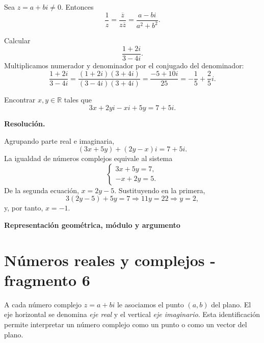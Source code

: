 \begin{proposition}
Sea \(z=a+bi\neq0\). Entonces
\[
\frac1z=\frac{\overline z}{z\overline z}
=\frac{a-bi}{a^2+b^2}.
\]
\end{proposition}

\begin{example}
Calcular
\[
\frac{1+2i}{3-4i}.
\]
Multiplicamos numerador y denominador por el conjugado del denominador:
\[
\frac{1+2i}{3-4i}
=\frac{(1+2i)(3+4i)}{(3-4i)(3+4i)}
=\frac{-5+10i}{25}
=-\frac15+\frac25i.
\]
\end{example}

\begin{solvedexercise}
Encontrar \(x,y\in\mathbb{R}\) tales que
\[
3x+2yi-xi+5y=7+5i.
\]

\textbf{Resolución.}\par\smallskip
Agrupando parte real e imaginaria,
\[
(3x+5y)+(2y-x)i=7+5i.
\]
La igualdad de números complejos equivale al sistema
\[
\begin{cases}
3x+5y=7,\\
-x+2y=5.
\end{cases}
\]
De la segunda ecuación, \(x=2y-5\). Sustituyendo en la primera,
\[
3(2y-5)+5y=7\Longrightarrow11y=22\Longrightarrow y=2,
\]
y, por tanto, \(x=-1\).
\end{solvedexercise}

\textbf{Representación geométrica, módulo y argumento}


\section{Números reales y complejos - fragmento 6}
A cada número complejo \(z=a+bi\) le asociamos el punto \((a,b)\) del plano. El eje horizontal se denomina \emph{eje real} y el vertical \emph{eje imaginario}. Esta identificación permite interpretar un número complejo como un punto o como un vector del plano.

\begin{center}
\end{center}


